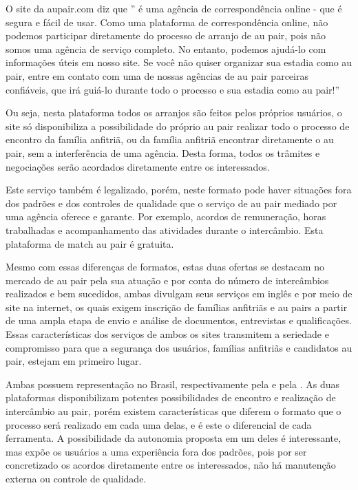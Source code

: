     O site da aupair.com diz que ”\cite{auPair.com2022} é uma agência de correspondência online - que é segura e fácil de usar. Como uma plataforma de correspondência online, não podemos participar diretamente do processo de arranjo de au pair, pois não somos uma agência de serviço completo. No entanto, podemos ajudá-lo com informações úteis em nosso site. Se você não quiser organizar sua estadia como au pair, entre em contato com uma de nossas agências de au pair parceiras confiáveis, que irá guiá-lo durante todo o processo e sua estadia como au pair!”
    
    Ou seja, nesta plataforma todos os arranjos são feitos pelos próprios usuários, o site só disponibiliza a possibilidade do próprio au pair realizar todo o processo de encontro da família anfitriã, ou da família anfitriã encontrar diretamente o au pair, sem a interferência de uma agência. Desta forma, todos os trâmites e negociações serão acordados diretamente entre os interessados.
    
    Este serviço também é legalizado, porém, neste formato pode haver situações fora dos padrões e dos controles de qualidade que o serviço de au pair mediado por uma agência oferece e garante. Por exemplo, acordos de remuneração, horas trabalhadas e acompanhamento das atividades durante o intercâmbio. Esta plataforma de \gls{match} au pair é gratuita.
    
    Mesmo com essas diferenças de formatos, estas duas ofertas se destacam no mercado de au pair pela sua atuação e por conta do número de intercâmbios realizados e bem sucedidos, ambas divulgam seus serviços em inglês e por meio de site na internet, os quais exigem inscrição de famílias anfitriãs e au pairs a partir de uma ampla etapa de envio e análise de documentos, entrevistas e qualificações. Essas características dos serviços de ambos os sites transmitem a seriedade e compromisso para que a segurança dos usuários, famílias anfitriãs e candidatos au pair, estejam em primeiro lugar. 
    
    Ambas possuem representação no Brasil, respectivamente pela \cite{experimCultl2022} e pela \cite{centralInter2022}. As duas plataformas disponibilizam potentes possibilidades de encontro e realização de intercâmbio au pair, porém existem características que diferem o formato que o processo será realizado em cada uma delas, e é este o diferencial de cada ferramenta. A possibilidade da autonomia proposta em um deles é interessante, mas expõe os usuários a uma experiência fora dos padrões, pois por ser concretizado os acordos diretamente entre os interessados, não há manutenção externa ou controle de qualidade.
    
